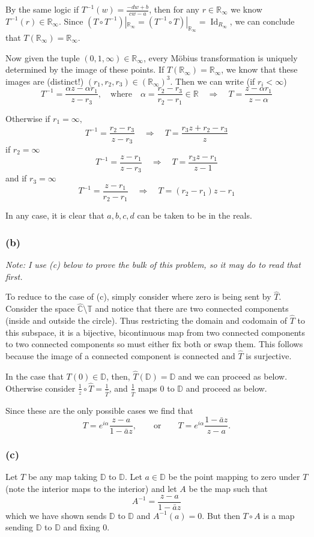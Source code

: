 \documentclass[12pt]{article}
\newcommand*{\R}{
\mathbb{R}
}
\newcommand*{\C}{
\mathbb{C}
}
\begin{document}
		By the same logic if $T^{-1}(w)=\frac{-dw+b}{cw-a}$, then for any $r\in\R_\infty$ we know $T^{-1}(r)\in\R_\infty$. Since $(T\circ T^{-1})|_{\R_\infty}=(T^{-1}\circ T)|_{\R_\infty}=\operatorname{Id}_{R_\infty}$, we can conclude that $T(\R_\infty)=\R_\infty$.
		
		Now given the tuple $(0,1,\infty)\in\R_\infty$, every M\"obius transformation is uniquely determined by the image of these points. If $T(\R_\infty)=\R_\infty$, we know that these images are (distinct!) $(r_1,r_2,r_3)\in(\R_\infty)^3$. Then we can write (if $r_i<\infty$)
		\[T^{-1}=\frac{\alpha z-\alpha r_1}{z-r_3},\quad\text{where}\quad \alpha=\frac{r_2-r_3}{r_2-r_1}\in\R\quad\Rightarrow\quad T=\frac{z-\alpha r_1}{z-\alpha}\]
		
		Otherwise if $r_1=\infty,$
		\[T^{-1}=\frac{r_2-r_3}{z-r_3}\quad\Rightarrow\quad T=\frac{r_3z+r_2-r_3}{z}\]
		if $r_2=\infty$
		\[T^{-1}=\frac{z-r_1}{z-r_3}\quad\Rightarrow\quad T=\frac{r_3z-r_1}{z-1}\]
		and if $r_3=\infty$
		\[T^{-1}=\frac{z-r_1}{r_2-r_1}\quad\Rightarrow\quad T=(r_2-r_1)z-r_1\]
		
		In any case, it is clear that $a,b,c,d$ can be taken to be in the reals.
		
		\subsubsection*{(b)}
		\textit{Note: I use (c) below to prove the bulk of this problem, so it may do to read that first.}
		
		To reduce to the case of (c), simply consider where zero is being sent by $\hat T$. Consider the space $\hat{\C}\setminus\mathbb{T}$ and notice that there are two connected components (inside and outside the circle). Thus restricting the domain and codomain of $\hat T$ to this subspace, it is a bijective, bicontinuous map from two connected components to two connected components so must either fix both or swap them. This follows because the image of a connected component is connected and $\hat T$ is surjective.
		
		In the case that $T(0)\in\mathbb{D}$, then, $\hat T(\mathbb{D})=\mathbb{D}$ and we can proceed as below. Otherwise consider $\frac{1}{z}\circ \hat T=\frac{1}{\hat T}$, and $\frac{1}{\hat T}$ maps $0$ to $\mathbb{D}$ and proceed as below.
		
		Since these are the only possible cases we find that
		\[T=e^{i\alpha}\frac{z-a}{1-\bar az},\qquad\text{or}\qquad T=e^{i\alpha}\frac{1-\bar az}{z-a}.\]
		\subsubsection*{(c)}
		Let $T$ be any map taking $\mathbb{D}$ to $\mathbb{D}$. Let $a\in\mathbb{D}$ be the point mapping to zero under $T$ (note the interior maps to the interior) and let $A$ be the map such that
		\[A^{-1}=\frac{z-a}{1-\bar az}\]
		which we have shown sends $\mathbb{D}$ to $\mathbb{D}$ and $A^{-1}(a)=0$. But then $T\circ A$ is a map sending $\mathbb{D}$ to $\mathbb{D}$ and fixing 0. 
		
\end{document}
